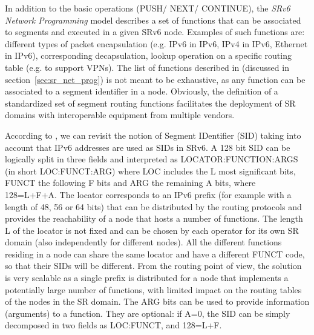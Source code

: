 In addition to the basic operations (PUSH/ NEXT/ CONTINUE), the \textit{SRv6 Network Programming} model \cite{id-srv6-network-prog} describes a set of functions that can be associated to segments and executed in a given SRv6 node. Examples of such functions are: different types of packet encapsulation (e.g. IPv6 in IPv6, IPv4 in IPv6, Ethernet in IPv6), corresponding decapsulation, lookup operation on a specific routing table (e.g. to support VPNs). The list of functions described in \cite{id-srv6-network-prog} (discussed in section~\ref{sec:sr_net_prog}) is not meant to be exhaustive, as any function can be associated to a segment identifier in a node. Obviously, the definition of a standardized set of segment routing functions facilitates the deployment of SR domains with interoperable equipment from multiple vendors.

According to \cite{id-srv6-network-prog}, we can revisit the notion of Segment IDentifier (SID) taking into account that IPv6 addresses are used as SIDs in SRv6. A 128 bit SID can be logically split in three fields and interpreted as LOCATOR:FUNCTION:ARGS (in short LOC:FUNCT:ARG) where LOC includes the L most significant bits, FUNCT the following F bits and ARG the remaining A bits, where 128=L+F+A. The locator corresponds to an IPv6 prefix (for example with a length of 48, 56 or 64 bits) that can be distributed by the routing protocols and provides the reachability of a node that hosts a number of functions. The length L of the locator is not fixed and can be chosen by each operator for its own SR domain (also independently for different nodes). All the different functions residing in a node can share the same locator and have a different FUNCT code, so that their SIDs will be different. From the routing point of view, the solution is very scalable as a single prefix is distributed for a node that implements a potentially large number of functions, with limited impact on the routing tables of the nodes in the SR domain. The ARG bits can be used to provide information (arguments) to a function. They are optional: if A=0, the SID can be simply decomposed in two fields as LOC:FUNCT, and 128=L+F. 

